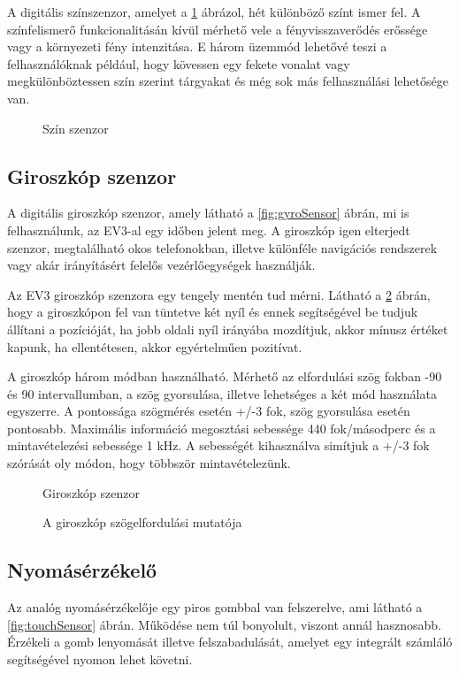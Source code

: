 A digitális színszenzor, amelyet a \ref{fig:colorSensor} ábrázol, hét különböző színt ismer fel. A színfelismerő funkcionalitásán kívül mérhető vele a fényvisszaverődés erőssége vagy a környezeti fény intenzitása. E három üzemmód lehetővé teszi a felhasználóknak például, hogy kövessen egy fekete vonalat vagy megkülönböztessen szín szerint tárgyakat és még sok más felhasználási lehetősége van.

\begin{figure}[!htb]
	\centering
	\caption{Szín szenzor}
	\label{fig:colorSensor}
\end{figure}

\subsection{Giroszkóp szenzor}

A digitális giroszkóp szenzor, amely látható a \ref{fig:gyroSensor} ábrán, mi is felhasználunk, az EV3-al egy időben jelent meg. A giroszkóp igen elterjedt szenzor, megtalálható okos telefonokban, illetve különféle navigációs rendszerek vagy akár irányításért felelős vezérlőegységek használják. 

Az EV3 giroszkóp szenzora egy tengely mentén tud mérni. Látható a \ref{fig:gyroFok} ábrán, hogy a giroszkópon fel van tüntetve két nyíl és ennek segítségével be tudjuk állítani a pozícióját, ha jobb oldali nyíl irányába mozdítjuk, akkor mínusz értéket kapunk, ha ellentétesen, akkor egyértelműen pozitívat. 

A giroszkóp három módban használható. Mérhető az elfordulási szög fokban -90 és 90 intervallumban, a szög gyorsulása, illetve lehetséges a két mód használata egyszerre. A pontossága szögmérés esetén +/-3 fok, szög gyorsulása esetén pontosabb. Maximális információ megosztási sebessége 440 fok/másodperc és a mintavételezési sebessége 1 kHz. A sebességét kihasználva simítjuk  a +/-3 fok szórását oly módon, hogy többször mintavételezünk.

\begin{figure}[!htb]
	\centering
	\caption{Giroszkóp szenzor}
	\label{fig:gyroSensor}
	\endminipage
	\caption{A giroszkóp szögelfordulási mutatója}
	\label{fig:gyroFok}
	\endminipage
\end{figure}

\subsection{Nyomásérzékelő}
Az analóg nyomásérzékelője egy piros gombbal van felszerelve, ami látható a \ref{fig:touchSensor} ábrán. Működése nem túl bonyolult, viszont annál hasznosabb. Érzékeli a gomb lenyomását illetve felszabadulását, amelyet egy integrált számláló segítségével nyomon lehet követni. 

